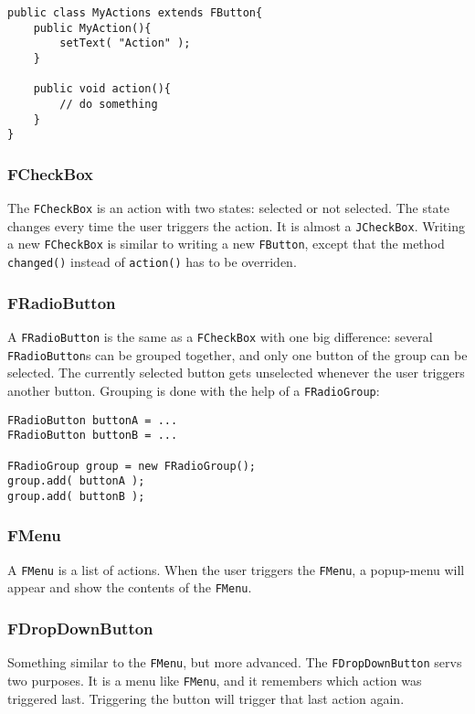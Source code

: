 \documentclass[a4paper,10pt]{article}
\newcommand{\src}[1]{\lstinline[basicstyle=\ttfamily]|#1|}
\begin{document}
\begin{lstlisting}
public class MyActions extends FButton{
	public MyAction(){
		setText( "Action" );
	}

	public void action(){
		// do something
	}
}
\end{lstlisting}

\subsubsection{FCheckBox}
The \src{FCheckBox} is an action with two states: selected or not selected. The state changes every time the user triggers the action. It is almost a \src{JCheckBox}. Writing a new \src{FCheckBox} is similar to writing a new \src{FButton}, except that the method \src{changed()} instead of \src{action()} has to be overriden.

\subsubsection{FRadioButton}
A \src{FRadioButton} is the same as a \src{FCheckBox} with one big difference: several \src{FRadioButton}s can be grouped together, and only one button of the group can be selected. The currently selected button gets unselected whenever the user triggers another button. Grouping is done with the help of a \src{FRadioGroup}:
\begin{lstlisting}
FRadioButton buttonA = ...
FRadioButton buttonB = ...

FRadioGroup group = new FRadioGroup();
group.add( buttonA );
group.add( buttonB );
\end{lstlisting}

\subsubsection{FMenu}
A \src{FMenu} is a list of actions. When the user triggers the \src{FMenu}, a popup-menu will appear and show the contents of the \src{FMenu}.

\subsubsection{FDropDownButton}
Something similar to the \src{FMenu}, but more advanced. The \src{FDropDownButton} servs two purposes. It is a menu like \src{FMenu}, and it remembers which action was triggered last. Triggering the button will trigger that last action again.
\end{document}
